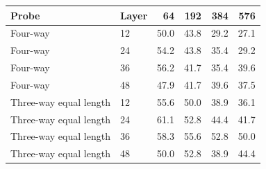 \begin{tabular}{llrrrr}
\toprule
Probe & Layer & 64 & 192 & 384 & 576 \\
\midrule
Four-way & 12 & 50.0 & 43.8 & 29.2 & 27.1 \\
Four-way & 24 & 54.2 & 43.8 & 35.4 & 29.2 \\
Four-way & 36 & 56.2 & 41.7 & 35.4 & 39.6 \\
Four-way & 48 & 47.9 & 41.7 & 39.6 & 37.5 \\
Three-way equal length & 12 & 55.6 & 50.0 & 38.9 & 36.1 \\
Three-way equal length & 24 & 61.1 & 52.8 & 44.4 & 41.7 \\
Three-way equal length & 36 & 58.3 & 55.6 & 52.8 & 50.0 \\
Three-way equal length & 48 & 50.0 & 52.8 & 38.9 & 44.4 \\
\bottomrule
\end{tabular}